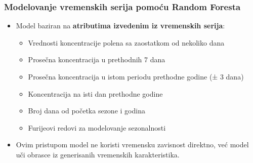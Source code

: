 \begin{frame}
    \frametitle{Modelovanje vremenskih serija pomoću Random Foresta}

    \begin{itemize}
        \item Model baziran na \textbf{atributima izvedenim iz vremenskih serija}:
        \begin{itemize}
            \item Vrednosti koncentracije polena sa zaostatkom od nekoliko dana
            \item Prosečna koncentracija u prethodnih 7 dana
            \item Prosečna koncentracija u istom periodu prethodne godine (± 3 dana)
            \item Koncentracija na isti dan prethodne godine
            \item Broj dana od početka sezone i godina
            \item Furijeovi redovi za modelovanje sezonalnosti
        \end{itemize}

        \vspace{0.3cm}
        \item Ovim pristupom model ne koristi vremensku zavisnost direktno, već model uči obrasce iz generisanih vremenskih karakteristika.
    \end{itemize}
\end{frame}
